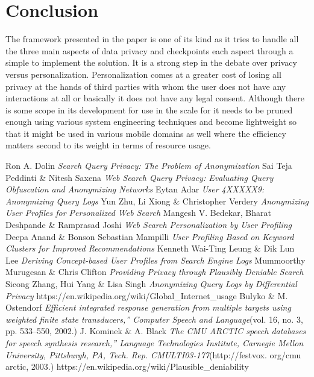 \documentclass[10pt, a4paper, twocolumn]{article} %
\begin{document}
\section{Conclusion}
The framework presented in the paper is one of its kind as it tries to handle all the three main aspects of data privacy and checkpoints each aspect through a simple to implement the solution. It is a strong step in the debate over privacy versus personalization. Personalization comes at a greater cost of losing all privacy at the hands of third parties with whom the user does not have any interactions at all or basically it does not have any legal consent. Although there is some scope in its development for use in the scale for it needs to be pruned enough using various system engineering techniques and become lightweight so that it might be used in various mobile domains as well where the efficiency matters second to its weight in terms of resource usage.
\begin{thebibliography}{unsrt}
\bibitem{}
 Ron A. Dolin \emph{Search Query Privacy: The Problem of Anonymization}
\bibitem{}
Sai Teja Peddinti \& Nitesh Saxena \emph{Web Search Query Privacy: Evaluating Query Obfuscation and Anonymizing Networks}
\bibitem{}
Eytan Adar \emph{User 4XXXXX9: Anonymizing Query Logs}
\bibitem{}
Yun Zhu, Li Xiong \& Christopher Verdery \emph{Anonymizing User Profiles for Personalized Web Search}
\bibitem{}
Mangesh V. Bedekar, Bharat Deshpande \& Ramprasad Joshi \emph{Web Search Personalization by User Profiling}
\bibitem{}
Deepa Anand \& Bonson Sebastian Mampilli \emph{User Profiling Based on Keyword Clusters for Improved Recommendations}
\bibitem{}
Kenneth Wai-Ting Leung \&  Dik Lun Lee \emph{Deriving Concept-based User Profiles from
Search Engine Logs}
\bibitem{}
Mummoorthy Murugesan \& Chris Clifton \emph{Providing Privacy through Plausibly Deniable Search}
\bibitem{}
Sicong Zhang, Hui Yang \& Lisa Singh \emph{Anonymizing Query Logs by Differential Privacy}
\bibitem{}
https://en.wikipedia.org/wiki/\newline Global\_Internet\_usage
\bibitem{}
Bulyko \& M. Ostendorf \emph{Efficient integrated response generation from multiple targets using weighted finite state transducers,” Computer Speech and Language}(vol. 16, no. 3, pp. 533–550, 2002.)
\bibitem{}
J. Kominek \& A. Black \emph{The CMU ARCTIC speech databases for speech synthesis research,” Language Technologies Institute, Carnegie Mellon University, Pittsburgh, PA, Tech. Rep. CMULTI03-177}(http://festvox. org/cmu arctic, 2003.)
\bibitem{}
https://en.wikipedia.org/wiki/Plausible\_deniability
 
\end{thebibliography}
\end{document}
